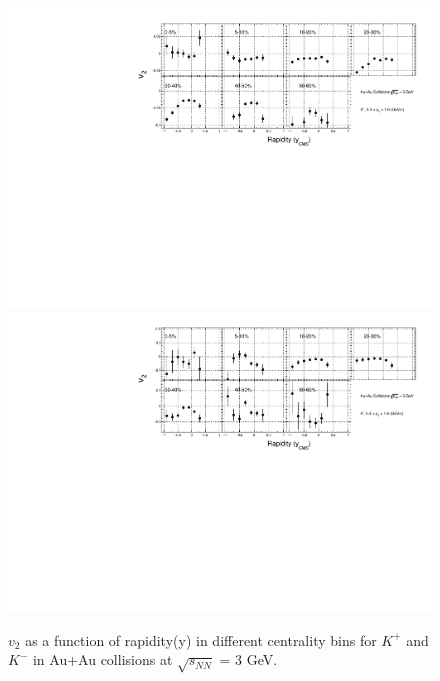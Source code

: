 \begin{figure}[h]
\includegraphics[scale=0.4]{chapter3/fig/v2ypikp/v2y_cent_kaonp.pdf}
\includegraphics[scale=0.4]{chapter3/fig/v2ypikp/v2y_cent_kaonm.pdf}
\caption{$v_{2}$ as a function of rapidity(y) in different centrality bins for $K^{+}$ and $K^{-}$ in Au+Au collisions at $\sqrt{s_{NN}}$ = 3 GeV.}
\label{kaon_v2y_cent}
\end{figure}

